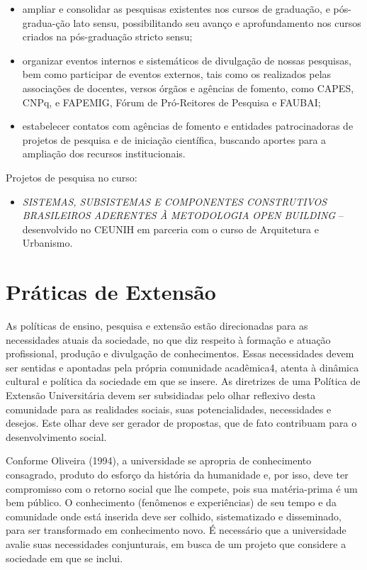\documentclass[a4paper, 12pt, openright, oneside, german, french, english, brazil]{abntex2}
\begin{document}
\begin{itemize}
\item ampliar e consolidar as pesquisas existentes nos cursos de graduação, e pós-gradua-ção lato sensu, possibilitando seu avanço e aprofundamento nos cursos criados na pós-graduação stricto sensu;
\item organizar eventos internos e sistemáticos de divulgação de nossas pesquisas, bem como participar de eventos externos, tais como os realizados pelas associações de docentes, versos órgãos e agências de fomento, como CAPES, CNPq, e FAPEMIG, Fórum de Pró-Reitores de Pesquisa e FAUBAI;
\item estabelecer contatos com agências de fomento e entidades patrocinadoras de projetos de pesquisa e de iniciação científica, buscando aportes para a ampliação dos recursos institucionais.
\end{itemize}

Projetos de pesquisa no curso:

\begin{itemize}
\item \textit{SISTEMAS, SUBSISTEMAS E COMPONENTES CONSTRUTIVOS BRASILEIROS ADERENTES À METODOLOGIA OPEN BUILDING} -- desenvolvido no CEUNIH em parceria com o curso de Arquitetura e Urbanismo.
\end{itemize}

\chapter{Práticas de Extensão}

As políticas de ensino, pesquisa e extensão estão direcionadas para as necessidades atuais da sociedade, no que diz respeito à formação e atuação profissional, produção e divulgação de conhecimentos. Essas necessidades devem ser sentidas e apontadas pela própria comunidade acadêmica4, atenta à dinâmica cultural e política da sociedade em que se insere. As diretrizes de uma Política de Extensão Universitária devem ser subsidiadas pelo olhar reflexivo desta comunidade para as realidades sociais, suas potencialidades, necessidades e desejos. Este olhar deve ser gerador de propostas, que de fato contribuam para o desenvolvimento social.

Conforme Oliveira (1994), a universidade se apropria de conhecimento consagrado, produto do esforço da história da humanidade e, por isso, deve ter compromisso com o retorno social que lhe compete, pois sua matéria-prima é um bem público. O conhecimento (fenômenos e experiências) de seu tempo e da comunidade onde está inserida deve ser colhido, sistematizado e disseminado, para ser transformado em conhecimento novo. É necessário que a universidade avalie suas necessidades conjunturais, em busca de um projeto que considere a sociedade em que se inclui.
\end{document}
